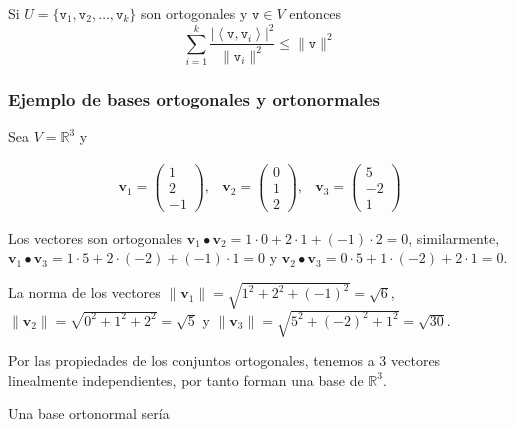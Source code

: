 \documentclass[
]{article}
\begin{document}
Si \(U=\{\mathtt{v}_1,\mathtt{v}_2,\ldots, \mathtt{v}_k\}\) son
ortogonales y \(\mathtt{v}\in V\) entonces \[
\sum_{i=1}^{k}\frac{|\left\langle \mathtt{v}, \mathtt{v}_i \right\rangle|^2}{\|\mathtt{v}_i\|^2} \leq \|\mathtt{v}\|^2
\]

\hypertarget{ejemplo-de-bases-ortogonales-y-ortonormales}{%
\subsubsection{Ejemplo de bases ortogonales y
ortonormales}\label{ejemplo-de-bases-ortogonales-y-ortonormales}}

Sea \(V=\mathbb{R}^{3}\) y

\[
\begin{array}{ccc}
\mathbf{v}_1 = 
               \begin{pmatrix} 1 \\ 2 \\ -1 \end{pmatrix}, & 
\mathbf{v}_2 = 
               \begin{pmatrix} 0 \\ 1 \\ 2 \end{pmatrix}, &
\mathbf{v}_3 = 
               \begin{pmatrix} 5 \\ -2 \\ 1 \end{pmatrix}               
\end{array}
\]

Los vectores son ortogonales
\(\mathbf{v}_1\bullet \mathbf{v}_2 = 1\cdot 0 + 2\cdot 1 + (-1)\cdot 2=0\),
similarmente,
\(\mathbf{v}_1\bullet \mathbf{v}_3 = 1\cdot 5 + 2\cdot(-2) + (-1)\cdot 1=0\)
y
\(\mathbf{v}_2\bullet \mathbf{v}_3 = 0\cdot 5 + 1\cdot (-2) + 2\cdot 1=0\).

La norma de los vectores
\(\|\mathbf{v}_1\|=\sqrt{1^2 + 2^2 + (-1)^2}=\sqrt{6}\),
\(\|\mathbf{v}_2\|=\sqrt{0^2 + 1^2 + 2^2}=\sqrt{5}\) y
\(\|\mathbf{v}_3\|=\sqrt{5^2 + (-2)^2 + 1^2}=\sqrt{30}\).

Por las propiedades de los conjuntos ortogonales, tenemos a 3 vectores
linealmente independientes, por tanto forman una base de
\(\mathbb{R}^3\).

Una base ortonormal sería
\end{document}

